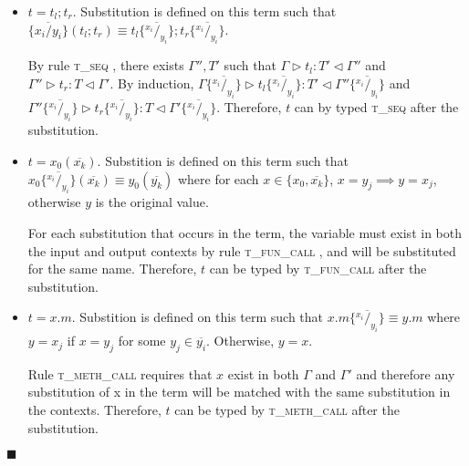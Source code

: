 \documentclass{article}
\newcommand{\tupd}{\textsc{t\_update} }
\newcommand{\tseq}{\textsc{t\_seq} }
\newcommand{\tfunc}{\textsc{t\_fun\_call} }
\newcommand{\tmethc}{\textsc{t\_meth\_call} }
\newcommand{\typerule}[4]{#1 \triangleright #2 : #3 \triangleleft #4}
\newcommand{\subst}[3]{#3 \{\overline{^{#1}/_{#2}}\}}
\newcommand{\qed}{$\blacksquare$}
\newenvironment{proof}{\vspace{1ex}\noindent{\bf Proof}\hspace{0.5em}}
  {\hfill\qed\vspace{1ex}}
\begin{document}
\begin{proof}
\begin{itemize}
By rule \tupd, there exists
$T', T'' \Gamma_1, \Gamma_2$ such that
$\Gamma = \Gamma_1, x : T''$ and $\Gamma' = \Gamma_2, x : T'$ with
$\typerule{\Gamma_1}{t'}{T''}{\Gamma_2}$. 

By induction,
substitution can be performed on $t'$ such that
$\typerule{\subst{x_i}{y_i}{\Gamma_1}}{\subst{x_i}{y_i}{t'}}{T''}{\subst{x_i}{y_i}{\Gamma_2}}$. 

\begin{itemize}
\item If $x \in \overline{y_i}$,
$\subst{x_i}{y_i}{\Gamma_1}, x : T'' \equiv (\subst{x_i}{y_i}{\Gamma_1}), x_j : T''$
and
$\subst{x_i}{y_i}{\Gamma_2}, x : T' \equiv (\subst{x_i}{y_i}{\Gamma_2}), x_j : T'$.
Therefore, $t$ can by typed by \tupd after the substitution.
\item If $x \notin \overline{y_i}$, then
$\subst{x_i}{y_i}{\Gamma_1}, x : T'' \equiv (\subst{x_i}{y_i}{\Gamma_1}), x : T''$
and
$\subst{x_i}{y_i}{\Gamma_2}, x : T' \equiv (\subst{x_i}{y_i}{\Gamma_2}), x : T'$.
Therefore, $t$ can be typed by \tupd after the substitution.
\end{itemize}

\item $t = t_l ; t_r$.
Substitution is defined on this term such that
$\{ \overline{x_i / y_i} \} ( t_l ; t_r ) \equiv \subst{x_i}{y_i}{t_l} ; \subst{x_i}{y_i}{t_r}$.

By rule \tseq, there exists $\Gamma'', T'$ such that
$\typerule{\Gamma}{t_l}{T'}{\Gamma''}$ and
$\typerule{\Gamma''}{t_r}{T}{\Gamma'}$. By induction,
$\typerule{\subst{x_i}{y_i}{\Gamma}}{\subst{x_i}{y_i}{t_l}}{T'}{\subst{x_i}{y_i}{\Gamma''}}$ and
$\typerule{\subst{x_i}{y_i}{\Gamma''}}{\subst{x_i}{y_i}{t_r}}{T}{\subst{x_i}{y_i}{\Gamma'}}$.
Therefore, $t$ can by typed \tseq after the substitution.

\item $t = x_0 ( \overline{x_k} )$.
Substition is defined on this term such that
$\subst{x_i}{y_i}{x_0} ( \overline{x_k} ) \equiv y_0 ( \overline{y_k} )$
where for each $x \in \{ x_0, \overline{x_k} \}$,
$x = y_j \implies y = x_j$, otherwise $y$ is the original value.

For each substitution that occurs in the term, the variable must exist in
both the input and output contexts by rule \tfunc, and will be substituted
for the same name. Therefore, $t$ can be typed by \tfunc after the
substitution.

\item $t = x.m$.
Substition is defined on this term such that
$\subst{x_i}{y_i}{x.m} \equiv y.m$
where $y = x_j$ if $x = y_j$ for some $y_j \in \overline{y_i}$.
Otherwise, $y = x$.

Rule \tmethc requires that $x$ exist in both $\Gamma$ and $\Gamma'$ and
therefore any substitution of x in the term will be matched with the
same substitution in the contexts. Therefore, $t$ can be typed by
\tmethc after the substitution.

\end{itemize}
\end{proof}
\end{document}
